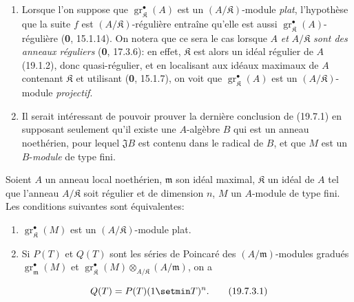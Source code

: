 \begin{remarks}[19.7.2]
\label{IV.19.7.2}
\begin{enumerate}
  \item[(i)] Lorsque l'on suppose que $\operatorname{gr}_{\mathfrak K}^\bullet(A)$ est un $(A/\mathfrak K)$-module \emph{plat}, l'hypothèse que la suite $f$ est $(A/\mathfrak K)$-régulière entraîne qu'elle est aussi $\operatorname{gr}_{\mathfrak K}^\bullet(A)$-régulière (\textbf{0}, 15.1.14). On notera que ce sera le cas lorsque $A$ \emph{et} $A/\mathfrak K$ \emph{sont des anneaux réguliers} (\textbf{0}, 17.3.6): en effet, $\mathfrak K$ est alors un idéal régulier de $A$ (19.1.2), donc quasi-régulier, et en localisant aux idéaux maximaux de $A$ contenant $\mathfrak K$ et utilisant (\textbf{0}, 15.1.7), on voit que $\operatorname{gr}_{\mathfrak K}^\bullet(A)$ est un $(A/\mathfrak K)$-module \emph{projectif}.
  \item[(ii)] Il serait intéressant de pouvoir prouver la dernière conclusion de (19.7.1) en supposant seulement qu'il existe une $A$-algèbre $B$ qui est un anneau noethérien, pour lequel $\mathfrak JB$ est contenu dans le radical de $B$, et que $M$ est un $B$-\emph{module} de type fini.
\end{enumerate}
\end{remarks}

\begin{corollary}[19.7.3]
\label{IV.19.7.3}
Soient $A$ un anneau local noethérien, $\mathfrak m$ son idéal maximal, $\mathfrak K$ un idéal de $A$ tel que l'anneau $A/\mathfrak K$ soit régulier et de dimension $n$, $M$ un $A$-module de type fini. Les conditions suivantes sont équivalentes:
\begin{enumerate}
  \item[\textup{a)}] $\operatorname{gr}_{\mathfrak K}^\bullet(M)$ est un $(A/\mathfrak K)$-module plat.
  \item[\textup{b)}] Si $P(T)$ et $Q(T)$ sont les séries de Poincaré des $(A/\mathfrak m)$-modules gradués $\operatorname{gr}_{\mathfrak m}^\bullet(M)$ et $\operatorname{gr}_{\mathfrak K}^\bullet(M)\otimes_{A/\mathfrak K}(A/\mathfrak m)$, on a
\end{enumerate}
\begin{equation}
  Q(T)=P(T)(1\setmin T)^n.
  \tag{19.7.3.1}\label{IV.19.7.3.1}
\end{equation}
\end{corollary}

